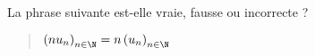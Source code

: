 La phrase suivante est-elle vraie, fausse ou incorrecte ?
\begin{quote}
  $\left(nu_n \right)_{n\in\N}=n\left(u_n \right)_{n\in\N}$
\end{quote}
